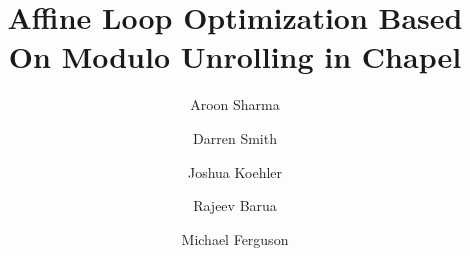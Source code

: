 \documentclass[10pt,letterpaper,twocolumn]{article}
\begin{document}
\title{Affine Loop Optimization Based On Modulo Unrolling in Chapel}
\author[1]{Aroon Sharma}
\author[1]{Darren Smith}
\author[1]{Joshua Koehler}
\author[1]{Rajeev Barua}
\author[2]{Michael Ferguson}

           
\maketitle









%

%


%


{
\begin{singlespace}
\vspace{-3ex}

\vspace{-2ex}

\end{singlespace}
}
\end{document}
